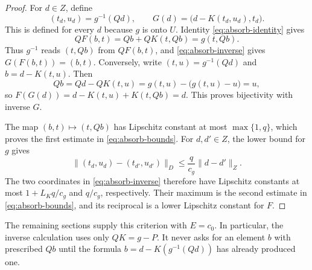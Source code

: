 \begin{proof}
For \(d\in Z\), define
\begin{equation}
 (t_d,u_d)=g^{-1}(Qd),\qquad
 G(d)=\bigl(d-K(t_d,u_d),t_d\bigr).                        \label{eq:absorb-inverse}
\end{equation}
This is defined for every \(d\) because \(g\) is onto \(U\).
Identity \eqref{eq:absorb-identity} gives
\[
 QF(b,t)=Qb+QK(t,Qb)=g(t,Qb).
\]
Thus \(g^{-1}\) reads \((t,Qb)\) from \(QF(b,t)\), and \eqref{eq:absorb-inverse} gives
\(G(F(b,t))=(b,t)\). Conversely, write \((t,u)=g^{-1}(Qd)\)
and \(b=d-K(t,u)\). Then
\[
 Qb=Qd-QK(t,u)=g(t,u)-\bigl(g(t,u)-u\bigr)=u,
\]
so \(F(G(d))=d-K(t,u)+K(t,Qb)=d\). This proves bijectivity with
inverse \(G\).

The map \((b,t)\mapsto(t,Qb)\) has Lipschitz constant at most
\(\max\{1,q\}\), which proves the first estimate in \eqref{eq:absorb-bounds}.
For \(d,d'\in Z\), the lower bound for \(g\) gives
\[
 \|(t_d,u_d)-(t_{d'},u_{d'})\|_D
       \leq \frac{q}{c_g}\|d-d'\|_Z.
\]
The two coordinates in \eqref{eq:absorb-inverse} therefore have Lipschitz constants at most
\(1+L_Kq/c_g\) and \(q/c_g\), respectively. Their maximum is the
second estimate in \eqref{eq:absorb-bounds}, and its reciprocal is a lower Lipschitz
constant for \(F\).
\end{proof}

The remaining sections supply this criterion with \(E=c_0\). In
particular, the inverse calculation uses only \(QK=g-P\). It never
asks for an element \(b\) with prescribed \(Qb\) until the formula
\(b=d-K(g^{-1}(Qd))\) has already produced one.
